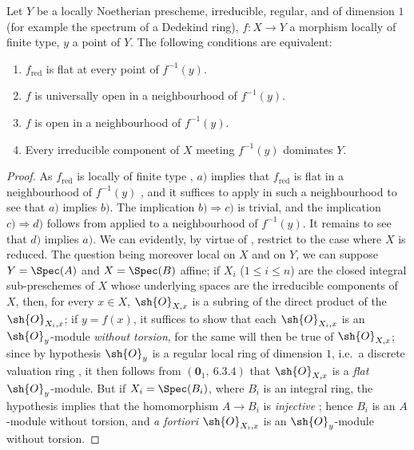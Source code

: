 \begin{proposition}[14.3.8]
\label{IV.14.3.8}
Let $Y$ be a locally Noetherian prescheme, irreducible, regular, and of dimension $1$ (for example the spectrum of a Dedekind ring), $f:X\to Y$ a morphism locally of finite type, $y$ a point of $Y$.
The following conditions are equivalent:
\begin{enumerate}[label=\emph{\alph*)}]
  \item $f_{\mathrm{red}}$ is flat at every point of $f^{-1}(y)$.
  \item $f$ is universally open in a neighbourhood of $f^{-1}(y)$.
  \item $f$ is open in a neighbourhood of $f^{-1}(y)$.
  \item Every irreducible component of $X$ meeting $f^{-1}(y)$ dominates $Y$.
\end{enumerate}
\end{proposition}

\begin{proof}
As $f_{\mathrm{red}}$ is locally of finite type , $a)$ implies that $f_{\mathrm{red}}$ is flat in a neighbourhood of $f^{-1}(y)$ , and it suffices to apply  in such a neighbourhood to see that $a)$ implies $b)$.
The implication $b)\Rightarrow c)$ is trivial, and the implication $c)\Rightarrow d)$ follows from  applied to a neighbourhood of $f^{-1}(y)$.
It remains to see that $d)$ implies $a)$.
We can evidently, by virtue of , restrict to the case where $X$ is reduced.
The question being moreover local on $X$ and on $Y$, we can suppose $Y=\Spec(A)$ and $X=\Spec(B)$
affine; if $X_i$ ($1\leq i\leq n$) are the closed integral sub-preschemes of $X$ whose underlying spaces are the irreducible components of $X$, then, for every $x\in X$, $\sh{O}_{X,x}$ is a subring of the direct product of the $\sh{O}_{X_i,x}$; if $y=f(x)$, it suffices to show that each $\sh{O}_{X_i,x}$ is an $\sh{O}_y$-module \emph{without torsion}, for the same will then be true of $\sh{O}_{X,x}$; since by hypothesis $\sh{O}_y$ is a regular local ring of dimension $1$, i.e.\ a discrete valuation ring , it then follows from $(\mathbf{0}_1,~6.3.4)$ that $\sh{O}_{X,x}$ is a \emph{flat} $\sh{O}_y$-module.
But if $X_i=\Spec(B_i)$, where $B_i$ is an integral ring, the hypothesis implies that the homomorphism $A\to B_i$ is \emph{injective} ; hence $B_i$ is an $A$-module without torsion, and \emph{a fortiori} $\sh{O}_{X_i,x}$ is an $\sh{O}_y$-module without torsion.
\end{proof}

